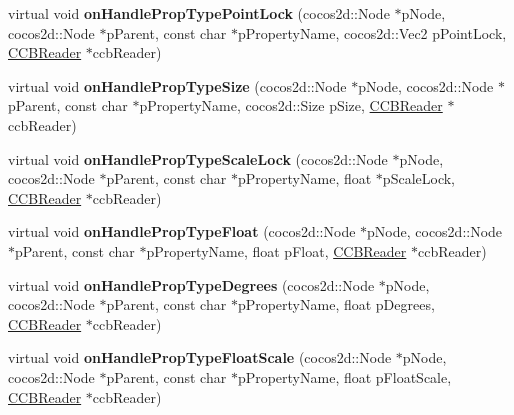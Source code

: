 \begin{DoxyCompactItemize}
\item 
\mbox{\label{classcocosbuilder_1_1NodeLoader_acad4b212ec263a6aa1bf3fce7a38b65e}} 
virtual void {\bfseries on\+Handle\+Prop\+Type\+Point\+Lock} (cocos2d\+::\+Node $\ast$p\+Node, cocos2d\+::\+Node $\ast$p\+Parent, const char $\ast$p\+Property\+Name, cocos2d\+::\+Vec2 p\+Point\+Lock, \hyperlink{classcocosbuilder_1_1CCBReader}{C\+C\+B\+Reader} $\ast$ccb\+Reader)
\item 
\mbox{\label{classcocosbuilder_1_1NodeLoader_a851417d89fffab9fd9dbd9e6d70e38c4}} 
virtual void {\bfseries on\+Handle\+Prop\+Type\+Size} (cocos2d\+::\+Node $\ast$p\+Node, cocos2d\+::\+Node $\ast$p\+Parent, const char $\ast$p\+Property\+Name, cocos2d\+::\+Size p\+Size, \hyperlink{classcocosbuilder_1_1CCBReader}{C\+C\+B\+Reader} $\ast$ccb\+Reader)
\item 
\mbox{\label{classcocosbuilder_1_1NodeLoader_aaa6dd39270abadbf1098d8521cfc131e}} 
virtual void {\bfseries on\+Handle\+Prop\+Type\+Scale\+Lock} (cocos2d\+::\+Node $\ast$p\+Node, cocos2d\+::\+Node $\ast$p\+Parent, const char $\ast$p\+Property\+Name, float $\ast$p\+Scale\+Lock, \hyperlink{classcocosbuilder_1_1CCBReader}{C\+C\+B\+Reader} $\ast$ccb\+Reader)
\item 
\mbox{\label{classcocosbuilder_1_1NodeLoader_a9f549f47d76f500298a2332b4dce52b7}} 
virtual void {\bfseries on\+Handle\+Prop\+Type\+Float} (cocos2d\+::\+Node $\ast$p\+Node, cocos2d\+::\+Node $\ast$p\+Parent, const char $\ast$p\+Property\+Name, float p\+Float, \hyperlink{classcocosbuilder_1_1CCBReader}{C\+C\+B\+Reader} $\ast$ccb\+Reader)
\item 
\mbox{\label{classcocosbuilder_1_1NodeLoader_a498652f5da763edc4445ab0ae88febf1}} 
virtual void {\bfseries on\+Handle\+Prop\+Type\+Degrees} (cocos2d\+::\+Node $\ast$p\+Node, cocos2d\+::\+Node $\ast$p\+Parent, const char $\ast$p\+Property\+Name, float p\+Degrees, \hyperlink{classcocosbuilder_1_1CCBReader}{C\+C\+B\+Reader} $\ast$ccb\+Reader)
\item 
\mbox{\label{classcocosbuilder_1_1NodeLoader_ac53f7be4680c7dab2025867d97e583f8}} 
virtual void {\bfseries on\+Handle\+Prop\+Type\+Float\+Scale} (cocos2d\+::\+Node $\ast$p\+Node, cocos2d\+::\+Node $\ast$p\+Parent, const char $\ast$p\+Property\+Name, float p\+Float\+Scale, \hyperlink{classcocosbuilder_1_1CCBReader}{C\+C\+B\+Reader} $\ast$ccb\+Reader)

\end{DoxyCompactItemize}
